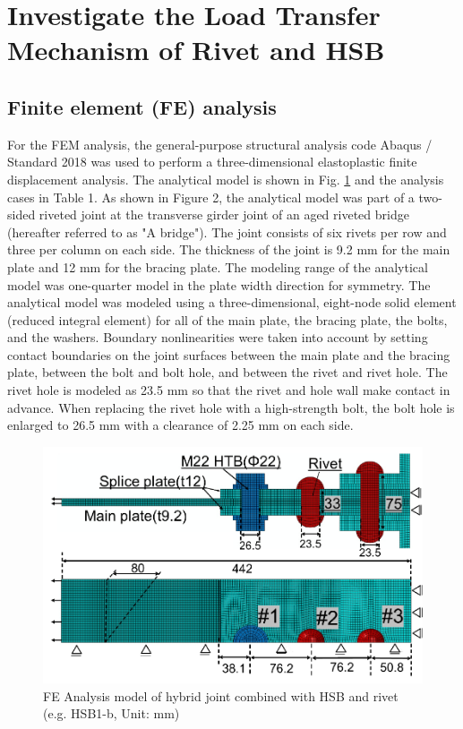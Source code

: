 \section{Investigate the Load Transfer Mechanism of Rivet and HSB}

\subsection{Finite element (FE) analysis}
\label{ch4sec2}

For the FEM analysis, the general-purpose structural analysis code Abaqus / Standard 2018 \cite{Smith2020} was used to perform a three-dimensional elastoplastic finite displacement analysis. The analytical model is shown in Fig. \ref{fig-femodel-hsbrive} and the analysis cases in Table 1. As shown in Figure 2, the analytical model was part of a two-sided riveted joint at the transverse girder joint of an aged riveted bridge (hereafter referred to as "A bridge"). The joint consists of six rivets per row and three per column on each side. The thickness of the joint is 9.2 mm for the main plate and 12 mm for the bracing plate. The modeling range of the analytical model was one-quarter model in the plate width direction for symmetry. The analytical model was modeled using a three-dimensional, eight-node solid element (reduced integral element) for all of the main plate, the bracing plate, the bolts, and the washers. Boundary nonlinearities were taken into account by setting contact boundaries on the joint surfaces between the main plate and the bracing plate, between the bolt and bolt hole, and between the rivet and rivet hole. The rivet hole is modeled as 23.5 mm so that the rivet and hole wall make contact in advance. When replacing the rivet hole with a high-strength bolt, the bolt hole is enlarged to 26.5 mm with a clearance of 2.25 mm on each side.

\begin{figure}[htbp]
    \centering
    \includegraphics[width=0.75\linewidth]{imgs//ch4/femodel-hsbrive.pdf}
    \caption{FE Analysis model of hybrid joint combined with HSB and rivet (e.g. HSB1-b, Unit: mm)}
    \label{fig-femodel-hsbrive}
\end{figure}


